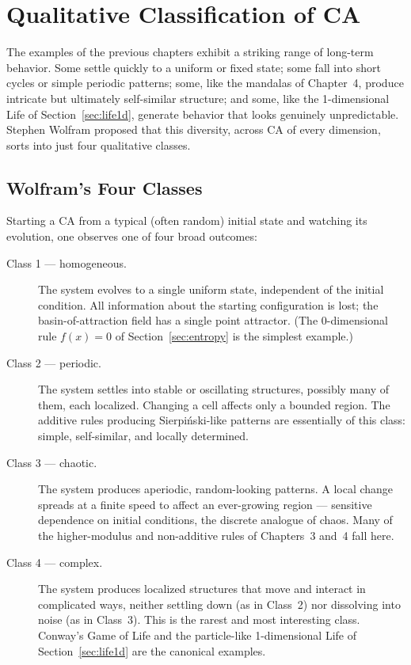 \chapter{Qualitative Classification of CA}
\label{ch:classification}

The examples of the previous chapters exhibit a striking range of
long-term behavior.  Some settle quickly to a uniform or fixed state;
some fall into short cycles or simple periodic patterns; some, like the
mandalas of Chapter~4, produce intricate but ultimately self-similar
structure; and some, like the 1-dimensional Life of
Section~\ref{sec:life1d}, generate behavior that looks genuinely
unpredictable.  Stephen Wolfram proposed that this diversity, across
CA of every dimension, sorts into just four qualitative classes.

\section{Wolfram's Four Classes}

Starting a CA from a typical (often random) initial state and watching
its evolution, one observes one of four broad outcomes:

\begin{description}
\item[Class 1 --- homogeneous.] The system evolves to a single uniform
  state, independent of the initial condition.  All information about
  the starting configuration is lost; the basin-of-attraction field
  has a single point attractor.  (The 0-dimensional rule $f(x)=0$ of
  Section~\ref{sec:entropy} is the simplest example.)
\item[Class 2 --- periodic.] The system settles into stable or
  oscillating structures, possibly many of them, each localized.
  Changing a cell affects only a bounded region.  The additive rules
  producing Sierpi\'nski-like patterns are essentially of this class:
  simple, self-similar, and locally determined.
\item[Class 3 --- chaotic.] The system produces aperiodic,
  random-looking patterns.  A local change spreads at a finite speed to
  affect an ever-growing region --- sensitive dependence on initial
  conditions, the discrete analogue of chaos.  Many of the
  higher-modulus and non-additive rules of Chapters~3 and~4 fall
  here.
\item[Class 4 --- complex.] The system produces localized structures
  that move and interact in complicated ways, neither settling down
  (as in Class~2) nor dissolving into noise (as in Class~3).  This is
  the rarest and most interesting class.  Conway's Game of Life and the
  particle-like 1-dimensional Life of Section~\ref{sec:life1d} are the
  canonical examples.
\end{description}

